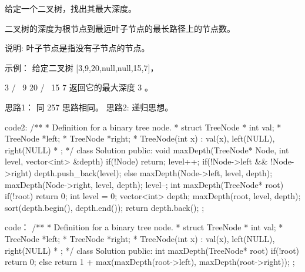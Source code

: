 给定一个二叉树，找出其最大深度。

二叉树的深度为根节点到最远叶子节点的最长路径上的节点数。

说明: 叶子节点是指没有子节点的节点。

示例：
给定二叉树 [3,9,20,null,null,15,7]，

    3
   / \
  9  20
    /  \
   15   7
返回它的最大深度 3 。



























思路1：
同 257 思路相同。
思路2:
递归思想。


















code2:
/**
 * Definition for a binary tree node.
 * struct TreeNode {
 *     int val;
 *     TreeNode *left;
 *     TreeNode *right;
 *     TreeNode(int x) : val(x), left(NULL), right(NULL) {}
 * };
 */
class Solution {
public:
    void maxDepth(TreeNode* Node, int level, vector<int> &depth)
    {
        if(!Node) return;
        level++;
        if(!Node->left && !Node->right) depth.push_back(level);
        else
        {
            maxDepth(Node->left, level, depth);
            maxDepth(Node->right, level, depth);
        }
        level--;
    }
    int maxDepth(TreeNode* root) {
        if(!root) return 0;
        int level = 0;
        vector<int> depth;
        maxDepth(root, level, depth);
        sort(depth.begin(), depth.end());
        return depth.back();
    }
};





















code：
/**
 * Definition for a binary tree node.
 * struct TreeNode {
 *     int val;
 *     TreeNode *left;
 *     TreeNode *right;
 *     TreeNode(int x) : val(x), left(NULL), right(NULL) {}
 * };
 */
class Solution {
public:
    int maxDepth(TreeNode* root) {
        if(!root) return 0;
        else return 1 + max(maxDepth(root->left), maxDepth(root->right));
    }
};